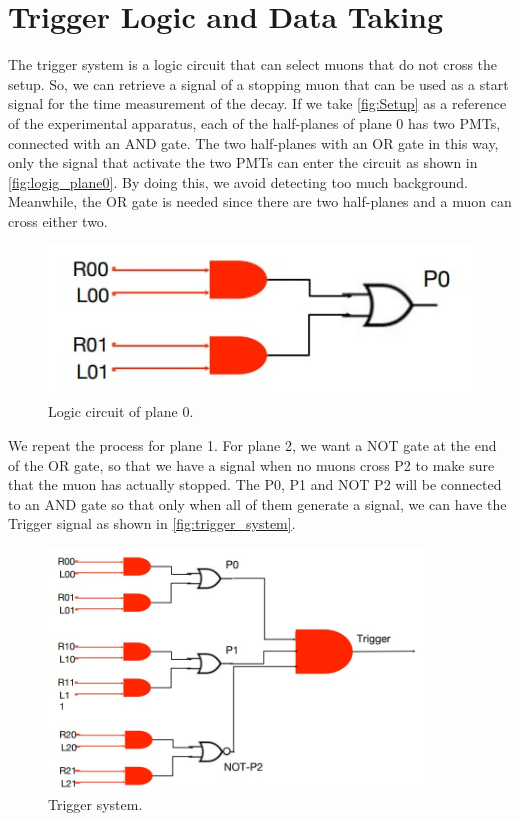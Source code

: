 \chapter{Trigger Logic and Data Taking}
\label{sec:trigger}
The trigger system is a logic circuit that can select muons
that do not cross the setup. So, we can retrieve a signal of a stopping muon 
that can be used as a start signal for the time measurement of the decay.
If we take \autoref{fig:Setup} as a reference of the experimental apparatus, 
each of the half-planes of plane 0 has two PMTs, connected with an AND gate.
The two half-planes with an OR gate in this way, only the signal
that activate the two PMTs can enter the circuit as shown in \autoref{fig:logig_plane0}.
By doing this, we avoid detecting too much background.
Meanwhile, the OR gate is needed since there are two half-planes
and a muon can cross either two.\\
\begin{figure}[h]
\begin{center}
\includegraphics[width=80 mm,scale=0.5]{figures/Cattura2.png}
\end{center}
\caption{Logic circuit of plane 0.}
\label{fig:logig_plane0}
\end{figure}
We repeat the process for plane 1. For plane 2, we want a NOT gate at the end of the OR gate, so that we have a signal when no muons cross P2 to make sure that the muon has actually stopped. The P0, P1 and NOT P2 will be connected to an AND
gate so that only when all of them generate a signal, we can have the Trigger signal as
shown in \autoref{fig:trigger_system}.

\begin{figure}[h]
\begin{center}
\includegraphics[width=100mm]{figures/Cattura3.png}
\end{center}
\caption{Trigger system.}
\label{fig:trigger_system}
\end{figure}

